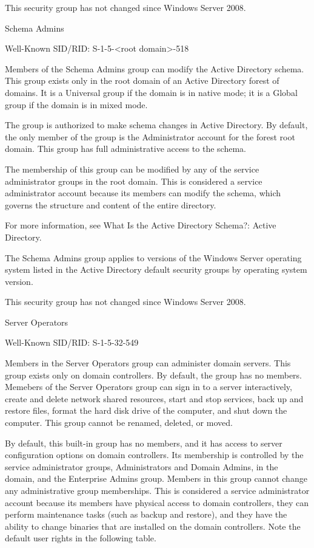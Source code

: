 This security group has not changed since Windows Server 2008.

Schema Admins

Well-Known SID/RID: S-1-5-<root domain>-518

Members of the Schema Admins group can modify the Active Directory schema. This group exists only in the root domain of an Active Directory forest of domains. It is a Universal group if the domain is in native mode; it is a Global group if the domain is in mixed mode.

The group is authorized to make schema changes in Active Directory. By default, the only member of the group is the Administrator account for the forest root domain. This group has full administrative access to the schema.

The membership of this group can be modified by any of the service administrator groups in the root domain. This is considered a service administrator account because its members can modify the schema, which governs the structure and content of the entire directory.

For more information, see What Is the Active Directory Schema?: Active Directory.

The Schema Admins group applies to versions of the Windows Server operating system listed in the Active Directory default security groups by operating system version.

This security group has not changed since Windows Server 2008.

Server Operators

Well-Known SID/RID: S-1-5-32-549

Members in the Server Operators group can administer domain servers. This group exists only on domain controllers. By default, the group has no members. Memebers of the Server Operators group can sign in to a server interactively, create and delete network shared resources, start and stop services, back up and restore files, format the hard disk drive of the computer, and shut down the computer. This group cannot be renamed, deleted, or moved.

By default, this built-in group has no members, and it has access to server configuration options on domain controllers. Its membership is controlled by the service administrator groups, Administrators and Domain Admins, in the domain, and the Enterprise Admins group. Members in this group cannot change any administrative group memberships. This is considered a service administrator account because its members have physical access to domain controllers, they can perform maintenance tasks (such as backup and restore), and they have the ability to change binaries that are installed on the domain controllers. Note the default user rights in the following table.

